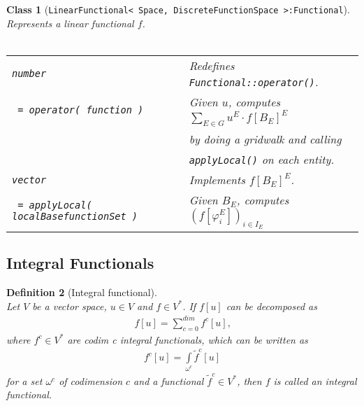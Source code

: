 \documentclass[a4paper,11pt]{article}
\numberwithin{equation}{section}
\newtheorem{definition}{Definition}[section]
\newtheorem{class}[definition]{Class}
\newcommand{\theoremNewline}{\hspace{1mm}\\}
\newcommand{\theoremEndLine}{\hspace{1mm}}
\newcommand{\Code}[1]{\texttt{#1}}
\newcommand{\CodeT}[1]{\textnormal{\texttt{#1}}}
\newcommand{\komma}{\text{,}}
\begin{document}
    \begin{class}[\Code{LinearFunctional< Space, DiscreteFunctionSpace >:Functional}]\theoremNewline
      Represents a linear functional $f$.\\\\
      \begin{tabular}{|l|l|}
        \hline
        \CodeT{number}
          & Redefines \CodeT{Functional::operator()}.\\
        \CodeT{ = operator( function )}
          & Given $u$, computes ${\sum\limits_{E \in G} u^E \cdot f[B_E]^E}$\\
          & by doing a gridwalk and calling\\
          & \CodeT{applyLocal()} on each entity.\\
        \hline
        \CodeT{vector}
          & Implements $f[B_E]^E$.\\
        \CodeT{ = applyLocal( localBasefunctionSet )}
          & Given $B_E$, computes ${( f [ \varphi_i^E ] )_{i \in I_E}}$\\
        \hline
      \end{tabular}
    \end{class}\theoremEndLine

  \subsection{Integral Functionals}

    \begin{definition}[Integral functional]\theoremNewline
      Let $V$ be a vector space, ${u \in V}$ and ${f \in V^*}$. If $f[u]$ can
      be decomposed as
      \begin{align}
        f[u] = \sum\limits_{c = 0}^{dim}
            {
              f^c [u]
            }\komma
      \end{align}
      where ${f^c \in V^*}$ are \textnormal{codim c integral functionals}, which can be written as
      \begin{align}
        f^c [u] = \int\limits_{\omega^c} \tilde{f}^c[u]
      \end{align}
      for a set $\omega^c$ of codimension $c$ and a functional ${\tilde{f}^c \in V^*}$, then $f$ is called an
      \textnormal{integral functional}.
    \end{definition}\theoremEndLine
\end{document}
